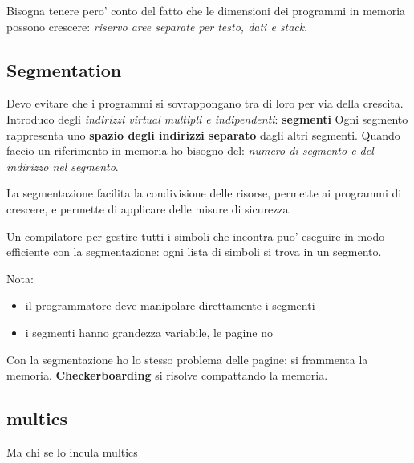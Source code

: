 Bisogna tenere pero' conto del fatto che le dimensioni dei programmi in memoria possono crescere: \textit{riservo aree separate per testo, dati e stack}.

\subsection{Segmentation}
Devo evitare che i programmi si sovrappongano tra di loro per via della crescita. Introduco degli \textit{indirizzi virtual multipli e indipendenti}: \textbf{segmenti}
Ogni segmento rappresenta uno \textbf{spazio degli indirizzi separato} dagli altri segmenti. 
Quando faccio un riferimento in memoria ho bisogno del: \textit{numero di segmento e del indirizzo nel segmento}.

La segmentazione facilita la condivisione delle risorse, permette ai programmi di crescere, e permette di applicare delle
misure di sicurezza.

Un compilatore per gestire tutti i simboli che incontra puo' eseguire in modo efficiente con la segmentazione:
ogni lista di simboli si trova in un segmento.

Nota:
\begin{itemize}
    \item il programmatore deve manipolare direttamente i segmenti
    \item i segmenti hanno grandezza variabile, le pagine no
\end{itemize}

Con la segmentazione ho lo stesso problema delle pagine: si frammenta la memoria. \textbf{Checkerboarding} si
risolve compattando la memoria.

\subsection{multics}
Ma chi se lo incula multics